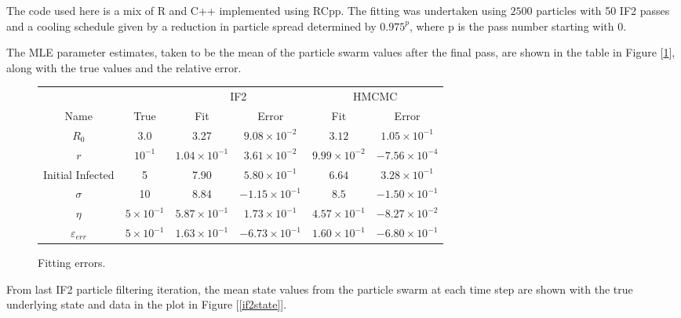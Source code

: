 	The code used here is a mix of R and C++ implemented using RCpp. The fitting was undertaken using $2500$ particles with 50 IF2 passes and a cooling schedule given by a reduction in particle spread determined by $0.975^{p}$, where p is the pass number starting with 0.

	The MLE parameter estimates, taken to be the mean of the particle swarm values after the final pass, are shown in the table in Figure [\ref{fiterror}], along with the true values and the relative error.

	\begin{figure}[H]
		\centering
		{\small
		\begin{tabular}{cccccc}
			& & \multicolumn{2}{c}{IF2} & \multicolumn{2}{c}{HMCMC} \\
			\cmidrule[1.0pt](r){3-4} \cmidrule[1.0pt](r){5-6}
			Name & True	& Fit & Error & Fit & Error \\
			\cmidrule[1.0pt](r){1-1} \cmidrule[1.0pt](r){2-2} \cmidrule[1.0pt](r){3-3} \cmidrule[1.0pt](r){4-4} \cmidrule[1.0pt](r){5-5} \cmidrule[1.0pt](r){6-6}
			$R_0$ 				& 3.0 				 & 3.27 					& $9.08 \times 10^{-2}$ 	& $3.12$ 				& $1.05 \times 10^{-1}$		\\
			$r$ 				& $10^{-1}$  		 & $1.04 \times 10^{-1}$ 	& $3.61 \times 10^{-2}$ 	& $9.99 \times 10^{-2}$ & $-7.56 \times 10^{-4}$	\\
			Initial Infected 	& 5  				 & 7.90 					& $5.80 \times 10^{-1}$ 	& $6.64$ 				& $3.28 \times 10^{-1}$ 	\\
			$\sigma$ 			& 10   				 & 8.84 					& $-1.15 \times 10^{-1}$ 	& $8.5$ 				& $-1.50 \times 10^{-1}$	\\
			$\eta$ 				& $5 \times 10^{-1}$ & $5.87 \times 10^{-1}$ 	& $1.73 \times 10^{-1}$ 	& $4.57 \times 10^{-1}$ & $-8.27 \times 10^{-2}$ 	\\
			$\varepsilon_{err}$ & $5 \times 10^{-1}$ & $1.63 \times 10^{-1}$ 	& $-6.73 \times 10^{-1}$ 	& $1.60 \times10^{-1}$  & $-6.80 \times 10^{-1}$
		\end{tabular}}
	    \caption{Fitting errors.}
        \label{fiterror}
    \end{figure}


	From last IF2 particle filtering iteration, the mean state values from the particle swarm at each time step are shown with the true underlying state and data in the plot in Figure [\ref{if2state}].

